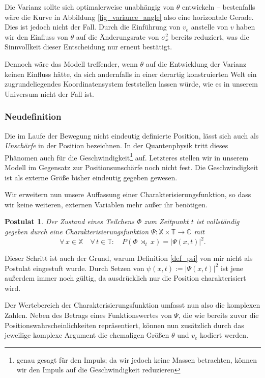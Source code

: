 \documentclass[a4paper,12pt,ngerman]{scrartcl}
\theoremstyle{plain}
\theoremstyle{plain}
\theoremstyle{plain}
\newtheorem{postulate}{Postulat}
\theoremstyle{plain}
\newcommand{\C}{\mathbb{C}}
\newcommand{\T}{\mathbb{T}}
\newcommand{\X}{\mathbb{X}}
\newcommand{\at}[1]{\;\rtimes_{#1}\;}
\begin{document}
Die Varianz sollte sich optimalerweise unabhängig von $\theta$ entwickeln -- bestenfalls wäre die Kurve in Abbildung \ref{fig_variance_angle} also eine horizontale Gerade. Dies ist jedoch nicht der Fall. Durch die Einführung von $v_e$ anstelle von $v$ haben wir den Einfluss von $\theta$ auf die Änderungsrate von $\sigma_x^2$ bereits reduziert, was die Sinnvollkeit dieser Entscheidung nur erneut bestätigt. 

Dennoch wäre das Modell treffender, wenn $\theta$ auf die Entwicklung der Varianz keinen Einfluss hätte, da sich andernfalls in einer derartig konstruierten Welt ein zugrundeliegendes Koordinatensystem feststellen lassen würde, wie es in unserem Universum nicht der Fall ist.

\subsubsection{Neudefinition}

Die im Laufe der Bewegung nicht eindeutig definierte Position, lässt sich auch als \textit{Unschärfe} in der Position bezeichnen. In der Quantenphysik tritt dieses Phänomen auch für die Geschwindigkeit\footnote{genau gesagt für den Impuls; da wir jedoch keine Massen betrachten, können wir den Impuls auf die Geschwindigkeit reduzieren} auf. Letzteres stellen wir in unserem Modell im Gegensatz zur Positionsunschärfe noch nicht fest. Die Geschwindigkeit ist als externe Größe bisher eindeutig gegeben gewesen.

Wir erweitern nun unsere Auffassung einer Charakterisierungsfunktion, so dass wir keine weiteren, externen Variablen mehr außer ihr benötigen.

{
\begin{postulate}
Der Zustand eines Teilchens $\Phi$ zum Zeitpunkt $t$ ist vollständig gegeben durch eine Charakterisierungsfunktion $\Psi: \X\times\T\rightarrow\C$ mit
\[\forall\, x\in\X\quad\forall\, t\in\T:\quad
P(\Phi\at{t}x)=|\Psi(x,t)|^2.\]
\end{postulate}
}

Dieser Schritt ist auch der Grund, warum Definition \ref{def_psi} von mir nicht als Postulat eingestuft wurde. Durch Setzen von $\psi(x,t):=|\Psi(x,t)|^2$ ist jene außerdem immer noch gültig, da ausdrücklich nur die Position charakterisiert wird.

Der Wertebereich der Charakterisierungsfunktion umfasst nun also die komplexen Zahlen. Neben des Betrags eines Funktionswertes von $\Psi$, die wie bereits zuvor die Positionswahrscheinlichkeiten repräsentiert, können nun zusätzlich durch das jeweilige komplexe Argument die ehemaligen Größen $\theta$ und $v_e$ kodiert werden.
\end{document}
